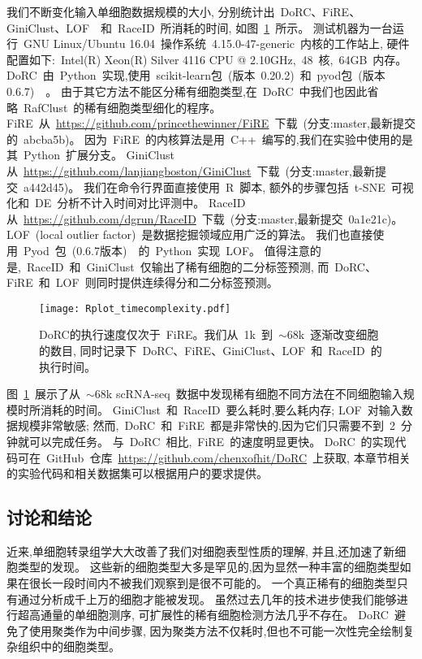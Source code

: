 我们不断变化输入单细胞数据规模的大小,
分别统计出~DoRC、FiRE、GiniClust、LOF~\cite{breunig2000lof}~和~RaceID~所消耗的时间,
如图~\ref{fig:timecomplexity}~所示。
测试机器为一台运行~GNU Linux/Ubuntu 16.04~操作系统~4.15.0-47-generic~内核的工作站上,
硬件配置如下:~Intel(R) Xeon(R) Silver 4116 CPU @ 2.10GHz,~48~核,~64GB~内存。
DoRC~由~Python~实现,使用~scikit-learn包~(版本~0.20.2)~\cite{pedregosa2011scikit}和~pyod包~(版本0.6.7)~~\cite{zhao2019pyod}。
由于其它方法不能区分稀有细胞类型,在~DoRC~中我们也因此省略~RafClust~的稀有细胞类型细化的程序。
FiRE~从~\url{https://github.com/princethewinner/FiRE}~下载~(分支:master,最新提交的~abcba5b)。
因为~FiRE~的内核算法是用~C++~编写的,我们在实验中使用的是其~Python~扩展分支。
GiniClust从~\url{https://github.com/lanjiangboston/GiniClust}~下载~(分支:master,最新提交~a442d45)。
我们在命令行界面直接使用~R~脚本,
额外的步骤包括~t-SNE~可视化和~DE~分析不计入时间对比评测中。
RaceID从~\url{https://github.com/dgrun/RaceID}~下载~(分支:master,最新提交~0a1e21c)。
LOF~(local outlier factor)~是数据挖掘领域应用广泛的算法。
我们也直接使用~Pyod~包~(0.6.7版本)~\cite{zhao2019pyod}~的~Python~实现~LOF。
值得注意的是,~RaceID~和~GiniClust~仅输出了稀有细胞的二分标签预测,
而~DoRC、FiRE~和~LOF~则同时提供连续得分和二分标签预测。
\begin{figure}[!htbp]
    \centering
    \texttt{[image: Rplot\_timecomplexity.pdf]}
    \caption{
    DoRC的执行速度仅次于~FiRE。我们从~1k~到~${\sim} 68$k~逐渐改变细胞的数目, 同时记录下~DoRC、FiRE、GiniClust、LOF~和~RaceID~的执行时间。    
    }
    \label{fig:timecomplexity}
\end{figure}
图~\ref{fig:timecomplexity}~展示了从~${\sim}68$k scRNA-seq~数据中发现稀有细胞不同方法在不同细胞输入规模时所消耗的时间。 
GiniClust~和~RaceID~要么耗时,要么耗内存;
LOF~对输入数据规模非常敏感;
然而,~DoRC~和~FiRE~都是非常快的,因为它们只需要不到~2~分钟就可以完成任务。
与~DoRC~相比,~FiRE~的速度明显更快。
DoRC~的实现代码可在~GitHub~仓库~\url{https://github.com/chenxofhit/DoRC}~上获取,
本章节相关的实验代码和相关数据集可以根据用户的要求提供。

\subsection{讨论和结论}
近来,单细胞转录组学大大改善了我们对细胞表型性质的理解,
并且,还加速了新细胞类型的发现。
这些新的细胞类型大多是罕见的,因为显然一种丰富的细胞类型如果在很长一段时间内不被我们观察到是很不可能的。
一个真正稀有的细胞类型只有通过分析成千上万的细胞才能被发现。
虽然过去几年的技术进步使我们能够进行超高通量的单细胞测序,
可扩展性的稀有细胞检测方法几乎不存在。
DoRC~避免了使用聚类作为中间步骤,
因为聚类方法不仅耗时,但也不可能一次性完全绘制复杂组织中的细胞类型。

